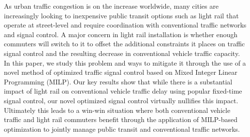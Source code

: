 As urban traffic congestion is on the increase worldwide, many cities are
increasingly looking to inexpensive public transit options such as light rail
that operate at street-level and require coordination with conventional traffic
networks and signal control. A major concern in light rail installation is
whether enough commuters will switch to it to offset the additional constraints
it places on traffic signal control and the resulting decrease in conventional
vehicle traffic capacity. In this paper, we study this problem and ways to
mitigate it through the use of a novel method of optimized traffic signal
control based on Mixed Integer Linear Programming (MILP). Our key results show
that while there is a substantial impact of light rail on conventional vehicle
traffic delay using popular fixed-time signal control, our novel optimized
 signal control virtually nullifies this impact. Ultimately this leads to a
win-win situation where both conventional vehicle traffic and light rail
commuters benefit through the application of MILP-based optimization to jointly
manage public transit and conventional traffic networks.
